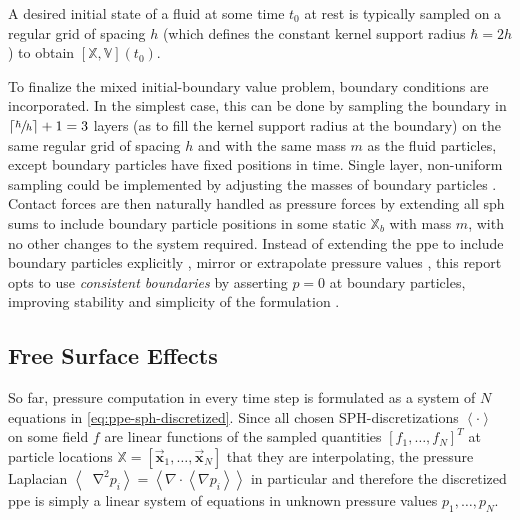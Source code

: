 \documentclass[conference]{IEEEtran}
\newcommand*\Laplace{\mathop{}\!\mathbin\nabla^2}
\newcommand\vek[1]{\vec{\bm{#1}}}
\newcommand\mat[1]{{\mathds{#1}}}
\newcommand\abr[1]{\left\langle#1\right\rangle}
\newcommand\divergence{{\nabla\cdot}}
\begin{document}
A desired initial state of a fluid at some time $t_0$ at rest is typically sampled on a regular grid of spacing $h$ (which defines the constant kernel support radius $\hbar=2h$) to obtain $[\mat{X}, \mat{V}](t_0)$.

To finalize the mixed initial-boundary value problem, boundary conditions are incorporated. In the simplest case, this can be done by sampling the boundary in $\lceil \sfrac{\hbar}{h} \rceil+1 = 3$ layers (as to fill the kernel support radius at the boundary) on the same regular grid of spacing $h$ and with the same mass $m$ as the fluid particles, except boundary particles have fixed positions in time. Single layer, non-uniform sampling could be implemented by adjusting the masses of boundary particles \cite{boundary2012akinci}. Contact forces are then naturally handled as pressure forces by extending all \ac{sph} sums to include boundary particle positions in some static $\mat{X}_b$ with mass $m$, with no other changes to the system required. Instead of extending the \ac{ppe} to include boundary particles explicitly \cite{pressure-boundaries}, mirror \cite{boundary2012akinci} or extrapolate pressure values \cite{mls-extrapolated-pressure-boundaries}, this report opts to use \textit{consistent boundaries} by asserting $p=0$ at boundary particles, improving stability and simplicity of the formulation \autocites{consistent-boundaries}{unified-pressure-probst}.



\subsection{Free Surface Effects}\label{sec:free-surface-effects}
So far, pressure computation in every time step is formulated as a system of $N$ equations in \autoref{eq:ppe-sph-discretized}. Since all chosen SPH-discretizations $\abr{\cdot}$ on some field $f$ are linear functions of the sampled quantities $[f_1,\dots,f_N]^T$ at particle locations $\mat{X}=[\vek{x}_1,\dots,\vek{x}_N]$ that they are interpolating, the pressure Laplacian $\abr{\Laplace p_i} = \abr{\divergence \abr{\nabla p_i}}$ in particular and therefore the discretized \ac{ppe} is simply a linear system of equations in unknown pressure values $p_1, \dots, p_N$. 
\end{document}
